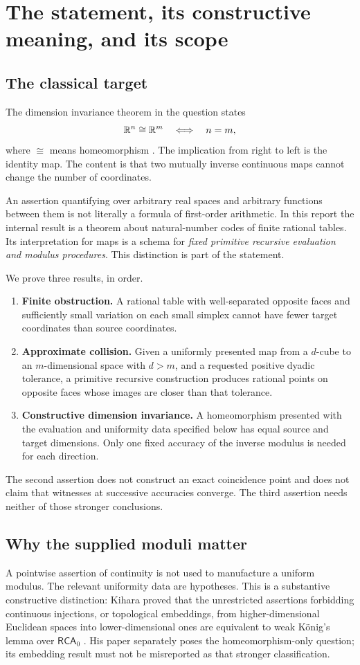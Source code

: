 \documentclass[11pt,a4paper]{article}
\theoremstyle{definition}
\begin{document}
\section{The statement, its constructive meaning, and its scope}
\subsection{The classical target}
The dimension invariance theorem in the question states
\[
             \mathbb R^n\cong\mathbb R^m \quad\Longleftrightarrow\quad n=m,
\]
where $\cong$ means homeomorphism \cite{mathworld}. The implication from
right to left is the identity map. The content is that two mutually
inverse continuous maps cannot change the number of coordinates.

An assertion quantifying over arbitrary real spaces and arbitrary
functions between them is not literally a formula of first-order
arithmetic. In this report the internal result is a theorem about
natural-number codes of finite rational tables. Its interpretation for
maps is a schema for \emph{fixed primitive recursive evaluation and
modulus procedures}. This distinction is part of the statement.

We prove three results, in order.
\begin{enumerate}
\item \textbf{Finite obstruction.} A rational table with well-separated
opposite faces and sufficiently small variation on each small simplex
cannot have fewer target coordinates than source coordinates.
\item \textbf{Approximate collision.} Given a uniformly presented map
from a $d$-cube to an $m$-dimensional space with $d>m$, and a requested
positive dyadic tolerance, a primitive recursive construction produces
rational points on opposite faces whose images are closer than that
tolerance.
\item \textbf{Constructive dimension invariance.} A homeomorphism
presented with the evaluation and uniformity data specified below has
equal source and target dimensions. Only one fixed accuracy of the
inverse modulus is needed for each direction.
\end{enumerate}
The second assertion does not construct an exact coincidence point and
does not claim that witnesses at successive accuracies converge. The
third assertion needs neither of those stronger conclusions.

\subsection{Why the supplied moduli matter}
A pointwise assertion of continuity is not used to manufacture a
uniform modulus. The relevant uniformity data are hypotheses. This is
a substantive constructive distinction: Kihara proved that the
unrestricted assertions forbidding continuous injections, or topological
embeddings, from higher-dimensional Euclidean spaces into
lower-dimensional ones are equivalent to weak K\"onig's lemma over
$\mathsf{RCA}_0$ \cite[Theorem 1]{kihara}. His paper separately poses the
homeomorphism-only question; its embedding result must not be
misreported as that stronger classification.
\end{document}
